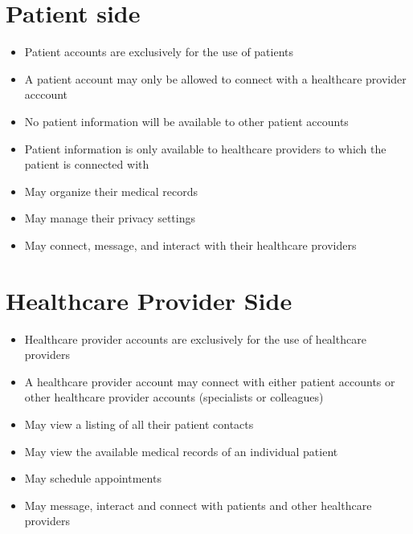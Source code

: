 \documentclass[12pt]{report}
\begin{document}
\section{Patient side}
\begin{itemize}
\item Patient accounts are exclusively for the use of patients
\item A patient account may only be allowed to connect with a healthcare provider acccount
\item No patient information will be available to other patient accounts
\item Patient information is only available to healthcare providers to which the patient is connected with
\item May organize their medical records
\item May manage their privacy settings
\item May connect, message, and interact with their healthcare providers
\end{itemize}

\section{Healthcare Provider Side}
\begin{itemize}
\item Healthcare provider accounts are exclusively for the use of healthcare providers
\item A healthcare provider account may connect with either patient accounts or other healthcare provider accounts (specialists or colleagues)
\item May view a listing of all their patient contacts
\item May view the available medical records of an individual patient
\item May schedule appointments
\item May message, interact and connect with patients and other healthcare providers
\end{itemize}
\end{document}
